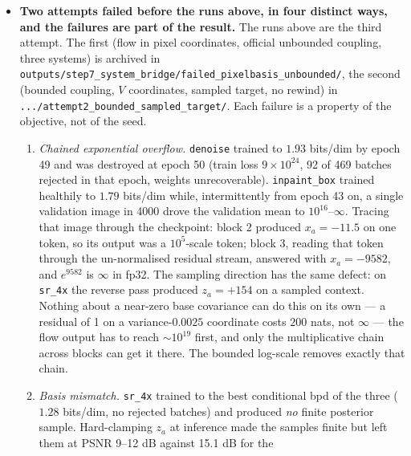 \documentclass[11pt]{article}
\begin{document}
\begin{itemize}
  \item \textbf{Two attempts failed before the runs above, in four distinct
        ways, and the failures are part of the result.} The runs above are
        the third attempt. The first (flow in pixel coordinates, official
        unbounded coupling, three systems) is archived in
        \texttt{outputs/step7\_system\_bridge/failed\_pixelbasis\_unbounded/},
        the second (bounded coupling, $V$ coordinates, sampled target, no
        rewind) in \texttt{.../attempt2\_bounded\_sampled\_target/}. Each
        failure is a property of the objective, not of the seed.
        \begin{enumerate}
          \item \emph{Chained exponential overflow.} \texttt{denoise} trained
                to $1.93$ bits/dim by epoch 49 and was destroyed at epoch 50
                (train loss $9\times10^{24}$, 92 of 469 batches rejected in
                that epoch, weights unrecoverable). \texttt{inpaint\_box}
                trained healthily to $1.79$ bits/dim while, intermittently
                from epoch 43 on, a single validation image in 4000 drove
                the validation mean to $10^{16}$--$\infty$.
                Tracing that image through the checkpoint: block 2 produced
                $x_a = -11.5$ on one token, so its output was a $10^5$-scale
                token; block 3, reading that token through the
                un-normalised residual stream, answered with
                $x_a = -9582$, and $e^{9582}$ is $\infty$ in fp32. The
                sampling direction has the same defect: on \texttt{sr\_4x}
                the reverse pass produced $z_a = +154$ on a sampled context.
                Nothing about a near-zero base covariance can do this on its
                own --- a residual of 1 on a variance-$0.0025$ coordinate
                costs $200$ nats, not $\infty$ --- the flow output has to
                reach $\sim 10^{19}$ first, and only the multiplicative
                chain across blocks can get it there. The bounded
                log-scale removes exactly that chain.
          \item \emph{Basis mismatch.} \texttt{sr\_4x} trained to the best
                conditional bpd of the three ($1.28$ bits/dim, no rejected
                batches) and produced \emph{no} finite posterior sample.
                Hard-clamping $z_a$ at inference made the samples finite but
                left them at PSNR 9--12 dB against 15.1 dB for the

\end{enumerate}
\end{itemize}
\end{document}
